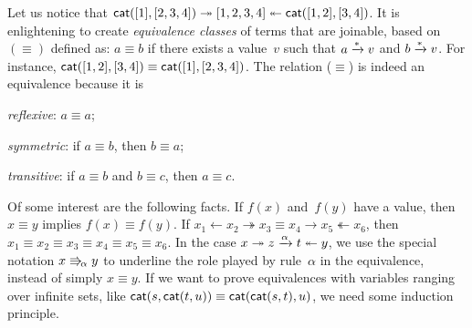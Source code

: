 Let us notice that \(\textsf{cat}([1], [2,3,4]) \twoheadrightarrow
[1,2,3,4] \twoheadleftarrow \textsf{cat}([1,2],
[3,4])\). It is enlightening to create
\emph{equivalence classes} of terms that are joinable, based
on~\((\equiv)\)   defined
as: \(a \equiv b\) if there exists a value~\(v\) such that \(a
\xrightarrow{\smash[t]{*}} v\) and \(b \xrightarrow{\smash{*}}
v\). For instance, \(\textsf{cat}([1,2], [3,4]) \equiv \textsf{cat}([1],
[2,3,4])\). The relation (\(\equiv\)) is indeed an equivalence
because it is
\begin{itemize*}
 
  \item \emph{reflexive}: \(a \equiv a\);

  \item \emph{symmetric}: if \(a \equiv b\), then \(b \equiv a\);

  \item \emph{transitive}: if \(a \equiv b\) and \(b \equiv c\), then
    \(a \equiv c\).

\end{itemize*}
Of some interest are the following facts. If \(f(x)\) and~\(f(y)\)
have a value, then \(x \equiv y\) implies \(f(x) \equiv f(y)\). If
\(x_1 \leftarrow x_2 \twoheadrightarrow x_3 \equiv x_4 \rightarrow x_5
\twoheadleftarrow x_6\), then \(x_1 \equiv x_2 \equiv x_3 \equiv x_4
\equiv x_5 \equiv x_6\). In the case \(x \twoheadrightarrow z
\xrightarrow{\smash{\alpha}} t \twoheadleftarrow y\), we use the
special notation \(x \Rrightarrow_{\!{\smash{\alpha}}} y\) to underline the role played by
rule~\(\alpha\) in the equivalence, instead of simply \(x \equiv
y\). If we want to prove equivalences with variables ranging over
infinite sets, like \(\textsf{cat}(s,\textsf{cat}(t,u)) \equiv
\textsf{cat}(\textsf{cat}(s,t),u)\), we need some
induction principle.


\label{par:well-founded}

